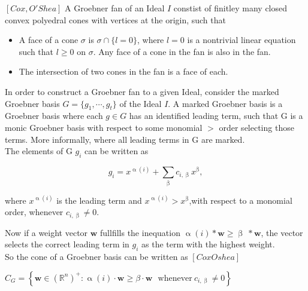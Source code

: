 \begin{env_definition}
$\left[ Cox,O'Shea\right]  $ A Groebner fan of an Ideal $I$ constist of finitley many closed convex polyedral cones with vertices at the origin, such that

\begin{itemize}
\item
A face of a cone $\sigma$ is $\sigma \cap \lbrace l=0\rbrace$, where $l=0$ is a nontrivial linear equation such that $l \geq 0$ on $\sigma$.
Any face of a cone in the fan is also in the fan.
\item
The intersection of two cones in the fan is a face of each.
\end{itemize}

\end{env_definition}

In order to construct a Groebner fan to a given Ideal, consider the marked Groebner basis $G = \lbrace g_{1},\cdots,g_{t}\rbrace $ of the Ideal $I$.
A marked Groebner basis is a Groebner basis where each $g \in G$ has an identified leading term, such that G is a monic Groebner basis with respect to some monomial $>$ order selecting those terms.
More informally, where all leading terms in G are marked.\\
The elements of G $g_{i}$ can be written as
\begin{center}
\[ g_{i} = x^{\upalpha\left( i\right) } +  \sum_{\upbeta} c_{i,\upbeta}x^{\upbeta}, \] 
\end{center}
where $ x^{\upalpha\left( i\right) }$ is the leading term and $ x^{\upalpha\left( i\right) } > x^{\upbeta} $,with respect to a monomial order, whenever $c_{i,\upbeta} \neq 0 $.

Now if a weight vector $\textbf{w}$ fullfills the inequation
$\upalpha\left( i\right) \ast \textbf{w} \geq \upbeta~\ast\textbf{w}$, the vector selects the correct leading term in $g_{i}$ as the term with the highest weight.\\

So the cone of a Groebner basis can be written as $ \left[Cox Oshea \right] $\\
\begin{center}
$C_{G} = \left\lbrace \textbf{w} \in \left(\mathbb{R}^{n}\right)^{+} : \upalpha\left( i\right) \cdot \textbf{w} \geq \beta \cdot \textbf{w}~~~ \textrm{whenever}~ c_{i,\upbeta} \neq 0 \right\rbrace   $
\end{center}


